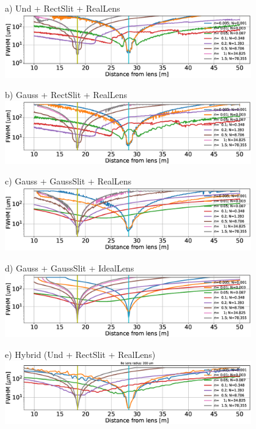 \documentclass{iucr}              %
\begin{document}
\begin{figure}
    \centering
    
    a) Und + RectSlit + RealLens \\
    \includegraphics[width=0.95\textwidth]{figures/oneTF_UndSource_RectSlit_R200um.eps}
    
    b) Gauss + RectSlit + RealLens \\
    \includegraphics[width=0.95\textwidth]{figures/oneTF_GaussianSource_RectSlit_R200um.eps}
    
    c) Gauss + GaussSlit + RealLens \\
    \includegraphics[width=0.95\textwidth]{figures/oneTF_GaussianSource_GaussianSlit_200um.eps}

    d) Gauss + GaussSlit + IdealLens \\
    \includegraphics[width=0.95\textwidth]{figures/oneTF_GaussianSource_GaussianSlit_IdealLens.eps}
    
    e) Hybrid (Und + RectSlit + RealLens) \\
    \includegraphics[width=0.95\textwidth]{figures/oneTF_ShadowHybrid_R200um.eps}
    

\end{figure}
\end{document}
